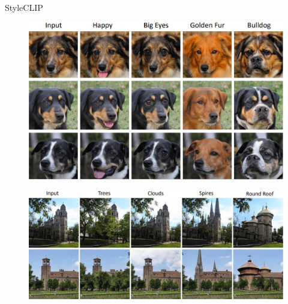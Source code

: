 \begin{frame}[allowframebreaks]{StyleCLIP}
\framebreak
    \begin{figure}
        \centering
        \includegraphics[width=1\textwidth,height=0.9\textheight,keepaspectratio]{images/video/slide_66_1_img.jpg}
    \end{figure}

\framebreak
    \begin{figure}
        \centering
        \includegraphics[width=1\textwidth,height=0.9\textheight,keepaspectratio]{images/video/slide_67_1_img.jpg}
    \end{figure}
\end{frame}